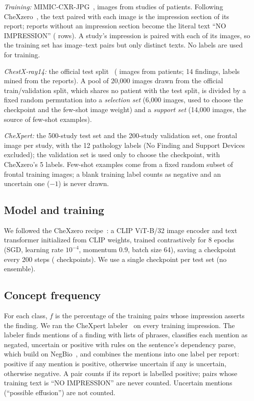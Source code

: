 \documentclass[journal]{IEEEtran}
\begin{document}
\emph{Training:} MIMIC-CXR-JPG~\cite{johnson2019mimiccxrjpg}, \MimicCxrPairs{} images from \MimicCxrStudies{} studies
of \MimicCxrPatients{} patients. Following CheXzero~\cite{tiu2022chexzero}, the text paired with each image
is the impression section of its report; reports without an impression section become the literal text
``NO IMPRESSION'' (\MimicCxrNoImpression{} rows). A study's impression is paired with each of its images, so the
training set has \MimicCxrPairs{} image--text pairs but only \MimicCxrUniqueTexts{} distinct texts. No labels are used
for training.

\emph{ChestX-ray14:} the official test split~\cite{wang2017chestxray8} (\NTest{} images from
\NTestPatients{} patients; 14 findings, labels mined from the reports). A pool of 20{,}000 images drawn
from the official train/validation split, which shares no patient with the test split, is divided by a
fixed random permutation into a \emph{selection set} (6{,}000 images, used to choose the checkpoint and
the few-shot image weight) and a \emph{support set} (14{,}000 images, the source of few-shot examples).

\emph{CheXpert:} the 500-study test set and the 200-study validation set, one frontal image per study,
with the 12 pathology labels (No Finding and Support Devices excluded); the validation set is used only
to choose the checkpoint, with CheXzero's 5 labels. Few-shot examples come from a fixed random subset of
\NCxpSupp{} frontal training images; a blank training label counts as negative and an uncertain one
($-1$) is never drawn.



\subsection{Model and training}
We followed the CheXzero recipe~\cite{tiu2022chexzero}: a CLIP ViT-B/32 image encoder and text
transformer initialized from CLIP weights, trained contrastively for 8 epochs (SGD, learning rate
$10^{-4}$, momentum 0.9, batch size 64), saving a checkpoint every 200 steps (\NCkpt{} checkpoints).
We use a single checkpoint per test set (no ensemble).

\subsection{Concept frequency}
For each class, $f$ is the percentage of the \MimicCxrPairs{} training pairs whose impression asserts the finding.
We ran the CheXpert labeler~\cite{irvin2019chexpert} on every training impression. 
The labeler finds mentions of a finding with lists of phrases, classifies each mention as negated, uncertain or positive with rules on the sentence's dependency parse, which build on NegBio~\cite{peng2018negbio}, and combines the mentions into one label per report: positive if any mention is positive, otherwise uncertain if any is uncertain, otherwise negative.
A pair counts if its report is labelled positive; pairs whose training text is ``NO IMPRESSION'' are never counted.
Uncertain mentions (``possible effusion'') are not counted.
\end{document}
